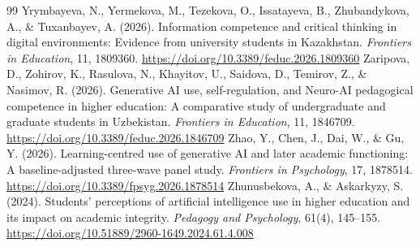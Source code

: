 \documentclass[11pt,a4paper]{article}
\begin{document}
\begin{thebibliography}{99}
 Yrymbayeva, N., Yermekova, M., Tezekova, O., Issatayeva, B., Zhubandykova, A., \& Tuxanbayev, A. (2026). Information competence and critical thinking in digital environments: Evidence from university students in Kazakhstan. \emph{Frontiers in Education}, 11, 1809360. \url{https://doi.org/10.3389/feduc.2026.1809360}
 Zaripova, D., Zohirov, K., Rasulova, N., Khayitov, U., Saidova, D., Temirov, Z., \& Nasimov, R. (2026). Generative AI use, self-regulation, and Neuro-AI pedagogical competence in higher education: A comparative study of undergraduate and graduate students in Uzbekistan. \emph{Frontiers in Education}, 11, 1846709. \url{https://doi.org/10.3389/feduc.2026.1846709}
 Zhao, Y., Chen, J., Dai, W., \& Gu, Y. (2026). Learning-centred use of generative AI and later academic functioning: A baseline-adjusted three-wave panel study. \emph{Frontiers in Psychology}, 17, 1878514. \url{https://doi.org/10.3389/fpsyg.2026.1878514}
 Zhunusbekova, A., \& Askarkyzy, S. (2024). Students' perceptions of artificial intelligence use in higher education and its impact on academic integrity. \emph{Pedagogy and Psychology}, 61(4), 145--155. \url{https://doi.org/10.51889/2960-1649.2024.61.4.008}
\end{thebibliography}
\end{document}
